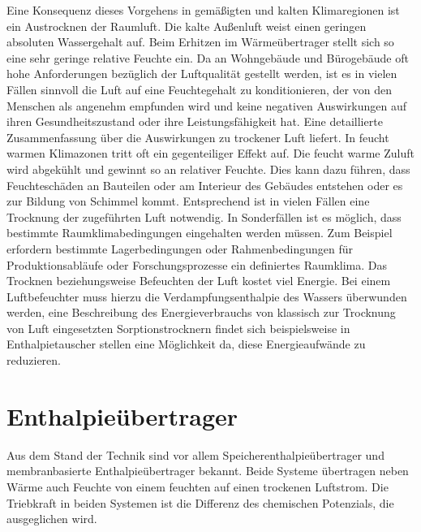 \begin{normalsize}
\begin{LARGE}
Eine Konsequenz dieses Vorgehens in gemäßigten und kalten Klimaregionen ist ein Austrocknen der Raumluft. Die kalte Außenluft weist einen geringen absoluten Wassergehalt auf. Beim Erhitzen im Wärmeübertrager stellt sich so eine sehr geringe relative Feuchte ein. 
Da an Wohngebäude und Bürogebäude oft hohe Anforderungen bezüglich der Luftqualität gestellt werden, ist es in vielen Fällen sinnvoll die Luft auf eine Feuchtegehalt zu konditionieren, der von den Menschen als angenehm empfunden wird und keine negativen Auswirkungen auf ihren Gesundheitszustand oder ihre Leistungsfähigkeit hat. Eine detaillierte Zusammenfassung über die Auswirkungen zu trockener Luft liefert.\cite{JurgenSchniedersDr.RainerPflugerDr.WolfgangFeist.Oktober}
In feucht warmen Klimazonen tritt oft ein gegenteiliger Effekt auf. Die feucht warme Zuluft wird abgekühlt und gewinnt so an relativer Feuchte. Dies kann dazu führen, dass Feuchteschäden an Bauteilen oder am Interieur des Gebäudes entstehen oder es zur Bildung von Schimmel kommt. Entsprechend ist in vielen Fällen eine Trocknung der zugeführten Luft notwendig. \cite{Zhang.2010}
In Sonderfällen ist es möglich, dass bestimmte Raumklimabedingungen eingehalten werden müssen. Zum Beispiel erfordern bestimmte Lagerbedingungen oder Rahmenbedingungen für Produktionsabläufe oder Forschungsprozesse ein definiertes Raumklima. 
Das Trocknen beziehungsweise Befeuchten der Luft kostet viel Energie. Bei einem Luftbefeuchter muss hierzu die Verdampfungsenthalpie des Wassers überwunden werden, eine Beschreibung des Energieverbrauchs von klassisch zur Trocknung von Luft eingesetzten Sorptionstrocknern findet sich beispielsweise in %
Enthalpietauscher stellen eine Möglichkeit da, diese Energieaufwände zu reduzieren. 

\section{Enthalpieübertrager}
\label{Enthalpieübertrager}

Aus dem Stand der Technik sind vor allem Speicherenthalpieübertrager und membranbasierte Enthalpieübertrager bekannt. Beide Systeme übertragen neben Wärme auch Feuchte von einem feuchten auf einen trockenen Luftstrom. Die Triebkraft in beiden Systemen ist die Differenz des chemischen Potenzials, die ausgeglichen wird. 


\end{LARGE}
\end{normalsize}
